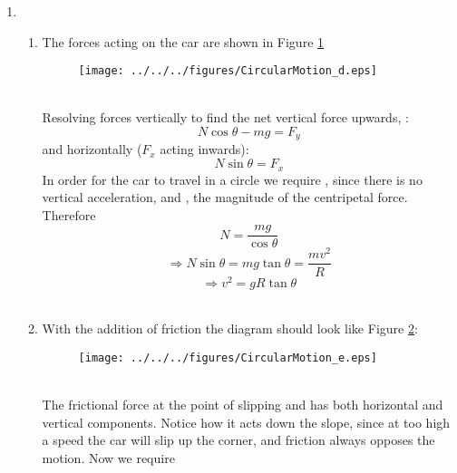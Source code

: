 \begin{problem}
{\begin{enumerate}
\\
\item
\begin{enumerate}
\item The forces acting on the car are shown in Figure \ref{fig:CircularMotion_d}
\begin{figure}[h]
\centering
\texttt{[image: ../../../figures/CircularMotion\_d.eps]}
\caption{}
\label{fig:CircularMotion_d}
\end{figure}
\\
Resolving forces vertically to find the net vertical force upwards, :
\begin{equation*} N\cos\theta-mg=F_y \end{equation*}
and horizontally ($F_x$ acting inwards):
\begin{equation*} N\sin\theta=F_x \end{equation*}
In order for the car to travel in a circle we require , since there is no vertical acceleration, and , the magnitude of the centripetal force. Therefore
\begin{equation*} N=\frac{mg}{\cos\theta} \end{equation*}
\begin{equation*} \Rightarrow N\sin\theta=mg\tan\theta=\frac{mv^2}{R} \end{equation*}
\begin{equation*} \Rightarrow v^2=gR\tan\theta \end{equation*}
\\
\item With the addition of friction the diagram should look like Figure \ref{fig:CircularMotion_e}:
\begin{figure}[h]
\centering
\texttt{[image: ../../../figures/CircularMotion\_e.eps]}
\caption{}
\label{fig:CircularMotion_e}
\end{figure}
\\
The frictional force  at the point of slipping and has both horizontal and vertical components. Notice how it acts down the slope, since at too high a speed the car will slip up the corner, and friction always opposes the motion. Now we require

\end{enumerate}
\end{enumerate}}
\end{problem}
